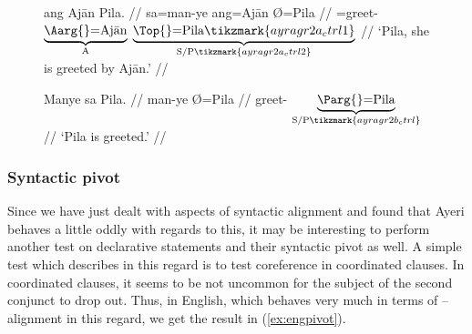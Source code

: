 \begin{figure}
\pex\label{ex:ayragr2}
\a\label{ex:ayragr2_1}\ljudge\ques%
\begingl[aboveglcskip=1.5em, aboveglftskip=1.75em]
	 {ang Ajān} Pila. //
	\glb sa=man-ye {ang=Ajān} {Ø=Pila} //
	\glc \PatT{}=greet-\TsgF{}
		$\underbrace{\text{\Aarg{}=\smash{Ajān}}}_{\text{A}}$
		$\underbrace{\text{\Top{}=Pila}\tikzmark{ayragr2a_ctrl1}}_%
			{\text{S/P}\tikzmark{ayragr2a_ctrl2}}$ //
	\glft `Pila, she is greeted by Ajān.' //
\endgl
{}

\a\label{ex:ayragr2_2}\begingl[aboveglftskip=1.75em]
	\gla Manye {sa Pila}. //
	\glb man-ye Ø=Pila //
	\glc greet-\TsgF{}
		$\underbrace{\text{\Parg{}=Pila}}_%
			{\text{S/P}\tikzmark{ayragr2b_ctrl}}$ //
	\glft `Pila is greeted.' //
\endgl
{}

\xe
\end{figure}

\subsubsection{Syntactic pivot}
\label{subsubsec:pivot}

Since we have just dealt with aspects of syntactic alignment and found that
Ayeri behaves a little oddly with regards to this, it may be interesting to
perform another test on declarative statements and their syntactic pivot as
well. A simple test which \citet[111--114]{comrie1989} describes in this regard
is to test coreference in coordinated clauses. In coordinated clauses, it seems
to be not uncommon for the subject of the second conjunct to drop out. Thus, in
English, which behaves very much in terms of \Nom{}--\Acc{} alignment in this
regard, we get the result in (\ref{ex:engpivot}).

